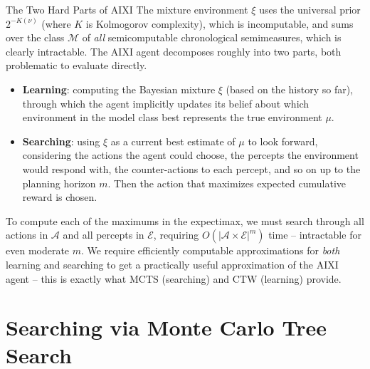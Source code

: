 \documentclass[aspectratio=169,10pt]{beamer}
\newcommand{\Acal}{\mathcal{A}}
\newcommand{\Ecal}{\mathcal{E}}
\newcommand{\Mcal}{\mathcal{M}}
\begin{document}
\begin{frame}{The Two Hard Parts of AIXI}
The mixture environment $\xi$ uses the universal prior $2^{-K(\nu)}$ (where $K$ is
Kolmogorov complexity), which is incomputable, and sums over the class $\Mcal$ of
\emph{all} semicomputable chronological semimeasures, which is clearly intractable. The
AIXI agent decomposes roughly into two parts, both problematic to evaluate directly.
\begin{itemize}
\item \textbf{Learning}: computing the Bayesian mixture $\xi$ (based on the history so
far), through which the agent implicitly updates its belief about which environment in
the model class best represents the true environment $\mu$.
\item \textbf{Searching}: using $\xi$ as a current best estimate of $\mu$ to look
forward, considering the actions the agent could choose, the percepts the environment
would respond with, the counter-actions to each percept, and so on up to the planning
horizon $m$. Then the action that maximizes expected cumulative reward is chosen.
\end{itemize}
To compute each of the maximums in the expectimax, we must search through all actions in
$\Acal$ and all percepts in $\Ecal$, requiring $O(|\Acal\times\Ecal|^m)$ time --
intractable for even moderate $m$. We require efficiently computable approximations for
\emph{both} learning and searching to get a practically useful approximation of the AIXI
agent -- this is exactly what MCTS (searching) and CTW (learning) provide.
\end{frame}

\section{Searching via Monte Carlo Tree Search}
\end{document}
